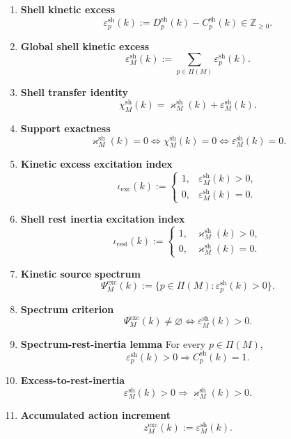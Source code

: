 \documentclass[11pt,letterpaper]{article}
\theoremstyle{plain}
\theoremstyle{definition}
\theoremstyle{remark}
\newcommand{\ExcIndex}{\iota}
\newcommand{\RestInertia}{\varkappa}
\newcommand{\TotInertia}{\chi}
\newcommand{\KinExcess}{\varepsilon}
\newcommand{\KinSource}{\Psi}
\begin{document}
\begin{enumerate}[resume]
\item \textbf{Shell kinetic excess}
\[
\KinExcess_p^{\mathrm{sh}}(k):=D_p^{\mathrm{sh}}(k)-C_p^{\mathrm{sh}}(k)\in\mathbb Z_{\ge 0}.
\]

\item \textbf{Global shell kinetic excess}
\[
\KinExcess_M^{\mathrm{sh}}(k):=\sum_{p\in\Pi(M)}\KinExcess_p^{\mathrm{sh}}(k).
\]

\item \textbf{Shell transfer identity}
\[
\TotInertia_M^{\mathrm{sh}}(k)
=
\RestInertia_M^{\mathrm{sh}}(k)+\KinExcess_M^{\mathrm{sh}}(k).
\]

\item \textbf{Support exactness}
\[
\RestInertia_M^{\mathrm{sh}}(k)=0
\iff
\TotInertia_M^{\mathrm{sh}}(k)=0
\iff
\KinExcess_M^{\mathrm{sh}}(k)=0.
\]

\item \textbf{Kinetic excess excitation index}
\[
\ExcIndex_{\mathrm{exc}}(k):=
\begin{cases}
1,& \KinExcess_M^{\mathrm{sh}}(k)>0,\\
0,& \KinExcess_M^{\mathrm{sh}}(k)=0.
\end{cases}
\]

\item \textbf{Shell rest inertia excitation index}
\[
\ExcIndex_{\mathrm{rest}}(k):=
\begin{cases}
1,& \RestInertia_M^{\mathrm{sh}}(k)>0,\\
0,& \RestInertia_M^{\mathrm{sh}}(k)=0.
\end{cases}
\]

\item \textbf{Kinetic source spectrum}
\[
\KinSource_M^{\mathrm{exc}}(k)
:=
\{p\in\Pi(M):\KinExcess_p^{\mathrm{sh}}(k)>0\}.
\]

\item \textbf{Spectrum criterion}
\[
\KinSource_M^{\mathrm{exc}}(k)\neq\varnothing
\iff
\KinExcess_M^{\mathrm{sh}}(k)>0.
\]

\item \textbf{Spectrum-rest-inertia lemma}
For every \(p\in\Pi(M)\),
\[
\KinExcess_p^{\mathrm{sh}}(k)>0
\Longrightarrow
C_p^{\mathrm{sh}}(k)=1.
\]

\item \textbf{Excess-to-rest-inertia}
\[
\KinExcess_M^{\mathrm{sh}}(k)>0
\Longrightarrow
\RestInertia_M^{\mathrm{sh}}(k)>0.
\]

\item \textbf{Accumulated action increment}
\[
z_M^{\mathrm{exc}}(k):=\KinExcess_M^{\mathrm{sh}}(k).
\]


\end{enumerate}
\end{document}
